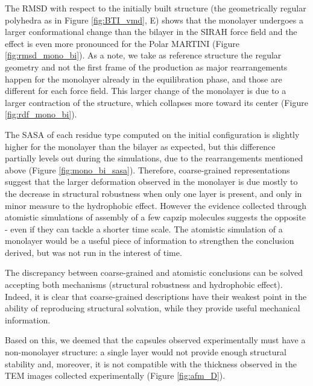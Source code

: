 The RMSD with respect to the initially built structure (the geometrically regular polyhedra as in Figure \ref{fig:BTI_vmd}, E) shows that the monolayer undergoes a larger conformational change than the bilayer in the SIRAH force field and the effect is even more pronounced for the Polar MARTINI (Figure \ref{fig:rmsd_mono_bi}). 
%
As a note, we take as reference structure the regular geometry and not the first frame of the production as major rearrangements happen for the monolayer already in the equilibration phase, and those are different for each force field.
%
This larger change of the monolayer is due to a larger contraction of the structure, which collapses more toward its center (Figure \ref{fig:rdf_mono_bi}).

The SASA of each residue type computed on the initial configuration is slightly higher for the monolayer than the bilayer as expected, but this difference partially levels out during the simulations, due to the rearrangements mentioned above (Figure \ref{fig:mono_bi_sasa}). Therefore, coarse-grained representations suggest that the larger deformation observed in the monolayer is due mostly to the decrease in structural robustness when only one layer is present, and only in minor measure to the hydrophobic effect.
%
However the evidence collected through atomistic simulations of assembly of a few capzip molecules suggests the opposite - even if they can tackle a shorter time scale.
The atomistic simulation of a monolayer would be a useful piece of information to strengthen the conclusion derived, but was not run in the interest of time.

The discrepancy between coarse-grained and atomistic conclusions can be solved accepting both mechanisms (structural robustness and hydrophobic effect). Indeed, it is clear that coarse-grained descriptions have their weakest point in the ability of reproducing structural solvation, while they provide useful mechanical information.
 
Based on this, we deemed that the capsules observed experimentally must have a non-monolayer structure: a single layer would not provide enough structural stability and, moreover, it is not compatible with the thickness observed in the TEM images collected experimentally (Figure \ref{fig:afm_D}).

